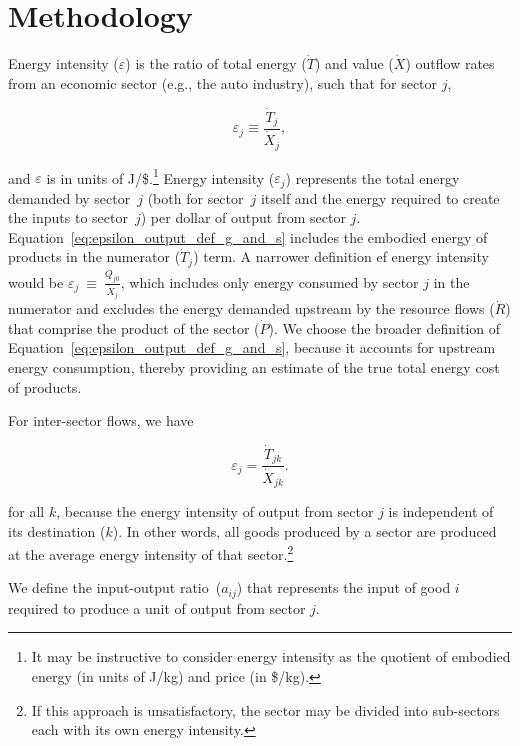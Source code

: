 \section{Methodology}

Energy intensity ($\varepsilon$)
is the ratio 
of total energy ($\dot{T}$) 
and value ($\dot{X}$) outflow rates 
from an economic sector (e.g., the auto industry), 
such that for sector $j$, %

\begin{equation} \label{eq:epsilon_output_def_g_and_s}
	\varepsilon_{j} \equiv \frac{\dot{T}_{j}}{\dot{X}_{j}},
\end{equation} 

\noindent{}and $\varepsilon$ is in units of J/\$.\footnote{It may be
instructive to consider energy intensity as the quotient
of embodied energy (in units of J/kg) and price (in \$/kg).}
Energy intensity ($\varepsilon_j$) represents the total energy demanded
by sector~$j$ (both for sector~$j$ itself and the energy required to
create the inputs to sector~$j$) per dollar of output from sector $j$.
Equation~\ref{eq:epsilon_output_def_g_and_s}
includes the embodied energy of products in the numerator ($\dot{T}_{j}$) term. 
A narrower definition ef energy intensity would be 
$\varepsilon_{j}~\equiv~\frac{\dot{Q}_{j0}}{\dot{X}_{j}}$,
which includes only energy consumed by sector $j$
in the numerator
and excludes the energy demanded upstream by the 
resource flows ($\dot{R}$) that comprise the product of the sector ($\dot{P}$).
We choose the broader definition of
Equation~\ref{eq:epsilon_output_def_g_and_s},
because it accounts for upstream energy consumption,
thereby providing an estimate of the true total energy cost of products.

For inter-sector flows, we have

\begin{equation} \label{eq:epsilon_transfers_1}
	\varepsilon_{j} = \frac{\dot{T}_{jk}}{\dot{X}_{jk}}.
\end{equation}

\noindent{}for all $k$, because the energy intensity 
of output from sector $j$ is independent of its destination ($k$). 
In other words, all goods produced by a sector 
are produced at the average energy intensity 
of that sector.\footnote{If this approach is unsatisfactory, 
the sector may be divided into sub-sectors 
each with its own energy intensity.}

We define the input-output ratio~($a_{ij}$)
that represents the input 
of good $i$ required to produce a unit of output from sector $j$.

